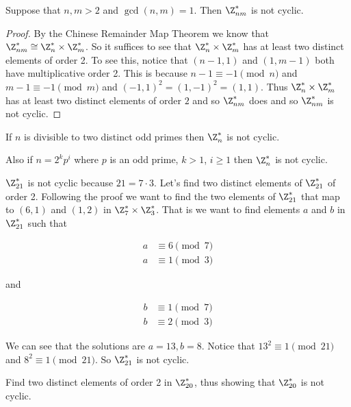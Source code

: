 \documentclass[oneside,12pt]{amsart}
\begin{document}
\begin{theorem}
Suppose that $n,m>2$ and $\gcd(n,m)=1$. Then $\Z^*_{nm}$ is not cyclic.
\end{theorem}
\begin{proof}
By the Chinese Remainder Map Theorem we know that $\Z^*_{nm} \cong \Z^*_n \times \Z^*_m$. So it suffices to see that
$\Z^*_n \times \Z^*_m$ has at least two distinct elements of order 2. To see this, notice that $(n-1,1)$ and $(1,m-1)$
both have multiplicative order 2. This is because $n-1 \equiv -1 \pmod n$ and $m-1 \equiv -1 \pmod m$
and $(-1,1)^2 = (1,-1)^2 = (1,1)$. Thus 
$\Z^*_n \times \Z^*_m$ has at least two distinct elements of order $2$ and so $\Z^*_{nm}$ does and so
$\Z^*_{nm}$ is not cyclic.
\end{proof}

\begin{corollary}
If $n$ is divisible to two distinct odd primes then $\Z^*_n$ is not cyclic.

Also if $n=2^kp^i$ where $p$ is an odd prime, $k>1$, $i\geq 1$ then $\Z^*_n$ is not cyclic.
\end{corollary}

\begin{example}
$\Z^*_{21}$ is not cyclic because $21=7\cdot 3$. Let's find two distinct elements of $\Z^*_{21}$ of order 2.
Following the proof we want to find the two elements of $\Z^*_{21}$ that map to $(6, 1)$ and $(1, 2)$ in 
$\Z^*_7\times \Z^*_3$. That is we want to find elements $a$ and $b$ in $\Z^*_{21}$ such that

\begin{align*}
a &\equiv 6 \pmod 7 \\
a &\equiv 1 \pmod 3
\end{align*}

and 

\begin{align*}
b &\equiv 1 \pmod 7 \\
b &\equiv 2 \pmod 3
\end{align*}

We can see that the solutions are $a=13, b=8$. Notice that $13^2 \equiv 1 \pmod {21}$ and $8^2 \equiv 1 \pmod {21}$.
So $\Z^*_{21}$ is not cyclic.
\end{example}

\begin{homework}
Find two distinct elements of order 2 in $\Z^*_{20}$, thus showing that $\Z^*_{20}$ is not cyclic.
\end{homework}
\end{document}
